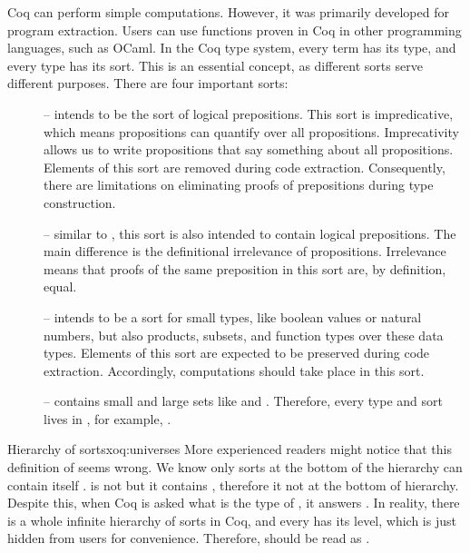 Coq can perform simple computations. However, it was primarily developed for program extraction. Users can use functions proven in Coq in other programming languages, such as OCaml. In the Coq type system, every term has its type, and every type has its sort. This is an essential concept, as different sorts serve different purposes. There are four important sorts:

\begin{description}
\item[] -- intends to be the sort of logical prepositions. This sort is impredicative, which means propositions can quantify over all propositions. Imprecativity allows us to write propositions that say something about all propositions. Elements of this sort are removed during code extraction. Consequently, there are limitations on eliminating proofs of prepositions during type construction.

\item[] -- similar to , this sort is also intended to contain logical prepositions. The main difference is the definitional irrelevance of propositions. Irrelevance means that proofs of the same preposition in this sort are, by definition, equal.

\item[] -- intends to be a sort for small types, like boolean values or natural numbers, but also products, subsets, and function types over these data types. Elements of this sort are expected to be preserved during code extraction. Accordingly, computations should take place in this sort.

\item[] -- contains small and large sets like  and . Therefore, every type and sort lives in , for example, .
\end{description}

\begin{coq}{Hierarchy of sorts}{xoq:universes}
 More experienced readers might notice that this definition of  seems wrong. We know only sorts at the bottom of the hierarchy can contain itself \cite{TypeNotInType}.  is not  but it contains , therefore it not at the bottom of hierarchy. Despite this, when Coq is asked what is the type of , it answers . In reality, there is a whole infinite hierarchy of sorts in Coq, and every  has its level, which is just hidden from users for convenience. Therefore,  should be read as .
\end{coq}

